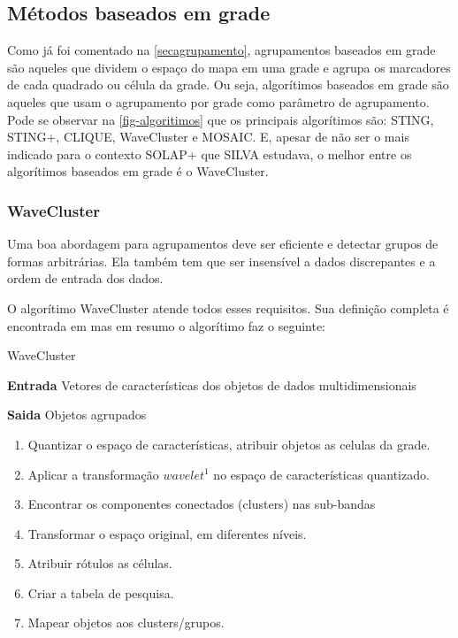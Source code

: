 		\subsection{Métodos baseados em grade}
		Como já foi comentado na \autoref{secagrupamento}, agrupamentos baseados em grade são aqueles que dividem o espaço do mapa em uma grade e agrupa os marcadores de cada quadrado ou célula da grade.  Ou seja, algorítimos baseados em grade são aqueles que usam o agrupamento por grade como parâmetro de agrupamento. 
		Pode se observar na \autoref{fig-algoritimos} que os principais algorítimos são: STING, STING+, CLIQUE, WaveCluster e MOSAIC. E, apesar de não ser o mais indicado para o contexto SOLAP+ que SILVA estudava, o melhor entre os algorítimos baseados em grade é o WaveCluster.
		
		
		\subsubsection{WaveCluster}
			Uma boa abordagem para agrupamentos deve ser eficiente e detectar grupos de formas arbitrárias. Ela também tem que ser insensível a dados discrepantes e a ordem de entrada dos dados.
			
			O algorítimo WaveCluster atende todos esses requisitos. Sua definição completa é encontrada em \cite{wavecluster} mas em resumo o algorítimo faz o seguinte:
\begin{algorithm}
\caption{WaveCluster}
\textbf{Entrada} Vetores de características dos objetos de dados multidimensionais

\textbf{Saida} Objetos agrupados
\begin{enumerate}
\item Quantizar o espaço de características, atribuir objetos as celulas da grade.
\item Aplicar a transformação $wavelet^1$ no espaço de características quantizado.
\item Encontrar os componentes conectados (clusters) nas sub-bandas
\item Transformar o espaço original, em diferentes níveis.
\item Atribuir rótulos as células.
\item Criar a tabela de pesquisa.
\item Mapear objetos aos clusters/grupos.
\end{enumerate}
\end{algorithm}

